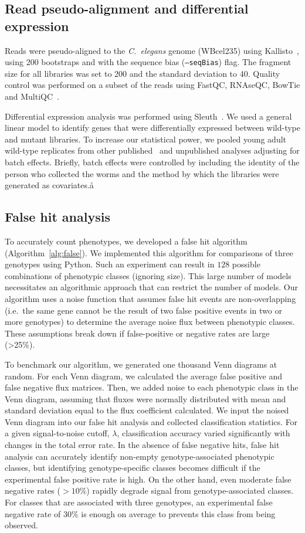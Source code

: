 \documentclass[9pt,twocolumn,twoside]{gsajnl}
\newcommand{\cel}{\emph{C.~elegans}}
\begin{document}
\subsection*{Read pseudo-alignment and differential expression}
Reads were pseudo-aligned to the \cel{} genome (WBcel235) using
Kallisto~\citep{Bray2016}, using 200 bootstraps and with the sequence bias
(\texttt{--seqBias}) flag. The fragment size for all libraries was set to 200
and the standard deviation to 40. Quality control was performed on a subset of
the reads using FastQC, RNAseQC, BowTie and MultiQC~\citep{Andrews2010,
Deluca2012, Langmead2009, Ewels2016}.

Differential expression analysis was performed using
Sleuth~\citep{Pimentel2016a}. We used a general linear model to identify genes
that were differentially expressed between wild-type and mutant libraries. To
increase our statistical power, we pooled young adult wild-type replicates from
other published~\citep{AngelesAlboresHIF, Angeles-Albores2017} and unpublished
analyses adjusting for batch effects. Briefly, batch effects were controlled by
including the identity of the person who collected the worms and the method
by which the libraries were generated as covariates.å

\subsection*{False hit analysis}
To accurately count phenotypes, we developed a false hit algorithm
(Algorithm~\ref{alg:false}). We implemented this algorithm for comparisons of
three genotypes using Python. Such an experiment can result in $128$ possible
combinations of phenotypic classes (ignoring size). This large number
of models necessitates an algorithmic approach that can restrict the
number of models. Our algorithm uses a noise function that assumes
false hit events are non-overlapping (i.e.\ the same gene cannot be the result
of two false positive events in two or more genotypes) to determine the average
noise flux between phenotypic classes. These assumptions break down if
false-positive or negative rates are large (>25\%).

To benchmark our algorithm, we generated one thousand Venn diagrams at random.
For each Venn diagram, we calculated the average false positive and false
negative flux matrices. Then, we added noise to each phenotypic class in the
Venn diagram, assuming that fluxes were normally distributed with mean and
standard deviation equal to the flux coefficient calculated. We input the noised
Venn diagram into our false hit analysis and collected classification
statistics. For a given signal-to-noise cutoff, $\lambda$, classification
accuracy varied significantly with changes in the total error rate. In the
absence of false negative hits, false hit analysis can accurately identify
non-empty genotype-associated phenotypic classes, but identifying
genotype-specific classes becomes difficult if the experimental false positive
rate is high. On the other hand, even moderate false negative rates ($>10\%$)
rapidly degrade signal from genotype-associated classes. For classes that are
associated with three genotypes, an experimental false negative rate of 30\% is
enough on average to prevents this class from being observed.
\end{document}
